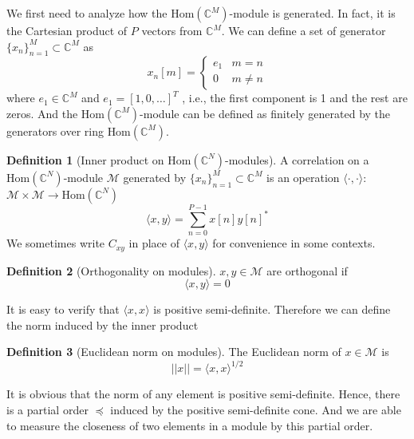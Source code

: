 \documentclass[12pt]{article}
\theoremstyle{definition}
\newtheorem{definition}{Definition}
\begin{document}
We first need to analyze how the $\mbox{Hom}\left(\mathbb{C}^M \right)$-module is generated. In fact, it is the Cartesian product of $P$ vectors from $\mathbb{C}^M$. We can define a set of generator $\{x_n \}_{n=1}^M\subset\mathbb{C}^M$ as 
$$
x_n[m]=\left\{
\begin{matrix}
	e_1&m=n\\
	0&m\not =n
\end{matrix}
\right.
$$
where $e_1\in\mathbb{C}^M$ and $e_1=[1,0,\dots]^T$ , i.e., the first component is 1 and the rest are zeros. And the $\mbox{Hom}\left(\mathbb{C}^M \right)$-module can be defined as finitely generated by the generators over ring $\mbox{Hom}\left(\mathbb{C}^M \right)$.
\begin{definition}[Inner product on $\mbox{Hom}\left(\mathbb{C}^N \right)$-modules]\label{def inner product}
	A correlation on a $\mbox{Hom}\left(\mathbb{C}^N \right)$-module $\mathcal{M}$ generated by $\{x_n \}_{n=1}^M\subset\mathbb{C}^M$ is an operation $\langle\cdot,\cdot\rangle$: $\mathcal{M}\times\mathcal{M}\rightarrow\mbox{Hom}\left(\mathbb{C}^N \right)$
	$$\langle x,y\rangle=\sum_{n=0}^{P-1}x[n]y[n]^*$$
	We sometimes write $C_{xy}$ in place of $\langle x,y\rangle$ for convenience in some contexts.
\end{definition}
\begin{definition}[Orthogonality on modules]\label{def orthogonality}
	$x,y\in\mathcal{M}$ are orthogonal if
	$$\langle x,y\rangle=0$$
\end{definition}
It is easy to verify that $\langle x,x\rangle$ is positive semi-definite. Therefore we can define the norm induced by the inner product
\begin{definition}[Euclidean norm on modules]\label{def norm}
	The Euclidean norm of $x\in\mathcal{M}$ is 
	$$||x||=\langle x,x\rangle^{1/2}$$
\end{definition}
It is obvious that the norm of any element is positive semi-definite. Hence, there is a partial order $\preceq$ induced by the positive semi-definite cone. And we are able to measure the closeness of two elements in a module by this partial order.
\end{document}
